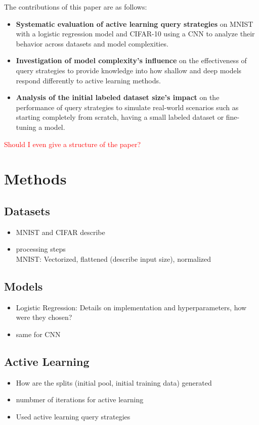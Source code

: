 \documentclass{article}
\theoremstyle{plain}
\theoremstyle{definition}
\theoremstyle{remark}
\begin{document}
The contributions of this paper are as follows:
\begin{itemize}
	\item \textbf{Systematic evaluation of active learning query strategies} on MNIST with a logistic regression model and CIFAR-10 using a CNN to analyze their behavior across datasets and model complexities.
	\item \textbf{Investigation of model complexity's influence} on the effectiveness of query strategies to provide knowledge into how shallow and deep models respond differently to active learning methods.
	\item \textbf{Analysis of the initial labeled dataset size's impact} on the performance of query strategies to simulate real-world scenarios such as starting completely from scratch, having a small labeled dataset or fine-tuning a model.
\end{itemize}

\textcolor{red}{Should I even give a structure of the paper?}

\section{Methods}\label{sec:methods}
\label{data_and_methods}
\subsection{Datasets}
\begin{itemize}
	\item MNIST and CIFAR describe
	\item processing steps \\
	MNIST: Vectorized, flattened (describe input size), normalized
\end{itemize}

\subsection{Models}
\begin{itemize}
	\item Logistic Regression: Details on implementation and hyperparameters, how were they chosen?
	\item same for CNN
\end{itemize}

\subsection{Active Learning}
\begin{itemize}
	\item How are the splits (initial pool, initial training data) generated
	\item numbmer of iterations for active learning
	\item Used active learning query strategies
\end{itemize}
\end{document}
